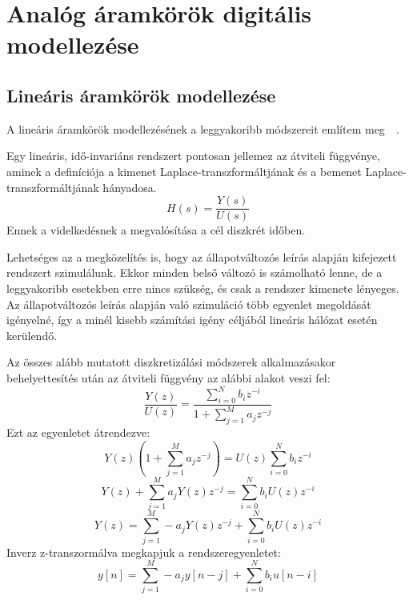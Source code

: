 \chapter{Analóg áramkörök digitális modellezése}

\section{Lineáris áramkörök modellezése}

A lineáris áramkörök modellezésének a leggyakoribb módszereit említem meg~\cite{transformations}~\cite{eulers}.

Egy lineáris, idő-invariáns rendszert pontosan jellemez az átviteli függvénye, aminek a definíciója  a kimenet 
Laplace-transzformáltjának és a bemenet Laplace-transzformáltjának hányadosa.
\begin{equation}
    H(s)=\frac{Y(s)}{U(s)}
\end{equation}
Ennek a videlkedésnek a megvalósítása a cél diszkrét időben.

Lehetséges az a megközelítés is, hogy az állapotváltozós leírás alapján kifejezett rendszert szimulálunk. Ekkor minden belső változó is számolható lenne, de a leggyakoribb esetekben erre nincs szükség, és csak a rendszer kimenete lényeges. Az állapotváltozós leírás alapján való szimuláció több egyenlet megoldását igényelné, így a minél kisebb számítási igény céljából lineáris hálózat esetén kerülendő.

Az összes alább mutatott diszkretizálási módszerek alkalmazásakor behelyettesítés után az átviteli függvény az alábbi alakot veszi fel:
\begin{equation}
    \frac{Y(z)}{U(z)}=\frac{\sum_{i=0}^{N}b_i z^{-i}}{1+\sum_{j=1}^{M}a_j z^{-j}}
\end{equation}
Ezt az egyenletet átrendezve:
\begin{equation}
    Y(z)(1+\sum_{j=1}^{M}a_j z^{-j})=U(z)\sum_{i=0}^{N}b_i z^{-i}
\end{equation}
\begin{equation}
    Y(z)+\sum_{j=1}^{M}a_j Y(z)z^{-j}=\sum_{i=0}^{N}b_i U(z)z^{-i}
\end{equation}
\begin{equation}
    Y(z)=\sum_{j=1}^{M}-a_j Y(z)z^{-j}+\sum_{i=0}^{N}b_i U(z)z^{-i}
\end{equation}
Inverz z-transzormálva megkapjuk a rendszeregyenletet:
\begin{equation}
    y[n]=\sum_{j=1}^{M}-a_j y[n-j]+\sum_{i=0}^{N}b_i u[n-i]
\end{equation}


